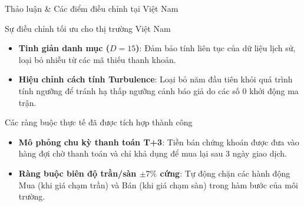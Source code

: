 \documentclass[10pt,aspectratio=169]{beamer}
\begin{document}
\begin{frame}{Thảo luận \& Các điểm điều chỉnh tại Việt Nam}
  \begin{block}{Sự điều chỉnh tối ưu cho thị trường Việt Nam}
    \begin{itemize}
      \item \textbf{Tinh giản danh mục ($D=15$)}: Đảm bảo tính liên tục của dữ liệu lịch sử, loại bỏ nhiễu từ các mã thiếu thanh khoản.
      \item \textbf{Hiệu chỉnh cách tính Turbulence}: Loại bỏ năm đầu tiên khỏi quá trình tính ngưỡng để tránh hạ thấp ngưỡng cảnh báo giả do các số 0 khởi động ma trận.
    \end{itemize}
  \end{block}
  \vspace{0.1cm}
  \begin{exampleblock}{Các ràng buộc thực tế đã được tích hợp thành công}
    \begin{itemize}
      \item \textbf{Mô phỏng chu kỳ thanh toán T+3}: Tiền bán chứng khoán được đưa vào hàng đợi chờ thanh toán và chỉ khả dụng để mua lại sau 3 ngày giao dịch.
      \item \textbf{Ràng buộc biên độ trần/sàn $\pm 7\%$ cứng}: Tự động chặn các hành động Mua (khi giá chạm trần) và Bán (khi giá chạm sàn) trong hàm bước của môi trường.
    \end{itemize}
  \end{exampleblock}
\end{frame}
\end{document}
